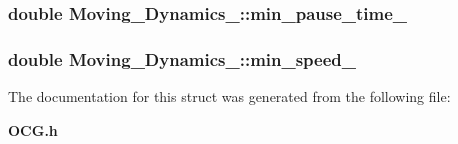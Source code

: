 \subsubsection[{min\_\-pause\_\-time\_\-}]{\setlength{\rightskip}{0pt plus 5cm}double {\bf Moving\_\-Dynamics\_\-::min\_\-pause\_\-time\_\-}}\label{structMoving__Dynamics___83425a756078241faab97572d8cddcc4}


\subsubsection[{min\_\-speed\_\-}]{\setlength{\rightskip}{0pt plus 5cm}double {\bf Moving\_\-Dynamics\_\-::min\_\-speed\_\-}}\label{structMoving__Dynamics___872788edfc7464fb3c05ab200a9ffae4}




The documentation for this struct was generated from the following file:\begin{CompactItemize}
\item 
{\bf OCG.h}\end{CompactItemize}
